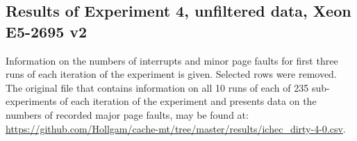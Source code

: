 \begin{appendices}

\chapter{Results of Experiment 4, unfiltered data, Xeon E5-2695 v2}
\label{app:app-level-results-4-ichec}

Information on the numbers of interrupts and minor page faults for first three runs of each iteration of the experiment is given. Selected rows were removed. The original file that contains information on all 10 runs of each of 235 sub-experiments of each iteration of the experiment and presents data on the numbers of recorded major page faults, may be found at: \url{https://github.com/Hollgam/cache-mt/tree/master/results/ichec\_dirty-4-0.csv}.


\end{appendices}